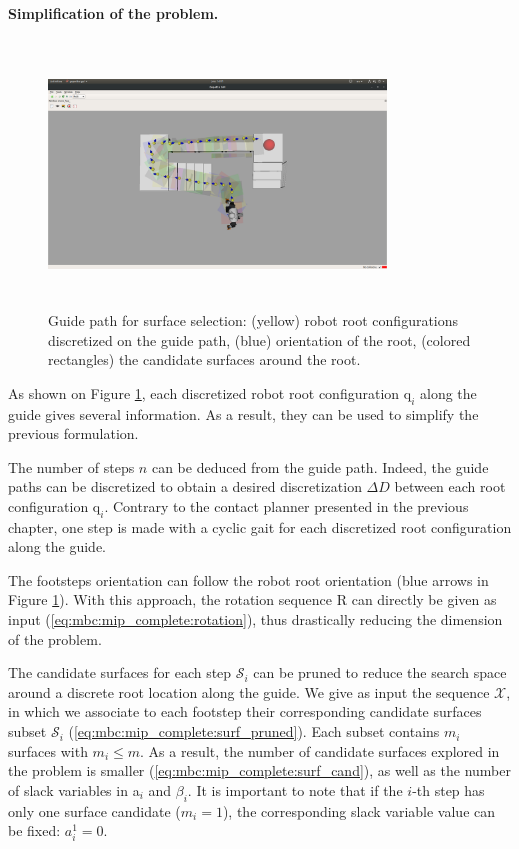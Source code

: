 \paragraph{Simplification of the problem.}
\begin{figure}[h!]
    \centering
    \captionsetup[subfigure]{justification=centering}
    \includegraphics[trim={15cm 5cm 18cm 7cm},clip,width=0.8\textwidth,height=7cm]{Figures/Chapter_MIP_SL1M/bauzil_guide_surfaces.png}
    \caption{Guide path for surface selection: (yellow) robot root configurations discretized on the guide path, (blue) orientation of the root, (colored rectangles) the candidate surfaces around the root.\label{fig:mip:bauzil_guide_surfaces}}
\end{figure}
As shown on Figure \ref{fig:mip:bauzil_guide_surfaces}, each discretized robot root configuration $\mbox{q}_i$ along the guide gives several information. As a result, they can be used to simplify the previous formulation.

The number of steps $n$ can be deduced from the guide path.
Indeed, the guide paths can be discretized to obtain a desired discretization $\Delta D$ between each root configuration $\mbox{q}_i$.
Contrary to the contact planner presented in the previous chapter, one step is made with a cyclic gait for each discretized root configuration along the guide.

The footsteps orientation can follow the robot root orientation (blue arrows in Figure \ref{fig:mip:bauzil_guide_surfaces}).
With this approach, the rotation sequence R can directly be given as input (\ref{eq:mbc:mip_complete:rotation}), thus drastically reducing the dimension of the problem.

The candidate surfaces for each step $\mathcal{S}_i$ can be pruned to reduce the search space around a discrete root location along the guide.
We give as input the sequence $\mathcal{X}$, in which we associate to each footstep their corresponding candidate surfaces subset $\mathcal{S}_i$ (\ref{eq:mbc:mip_complete:surf_pruned}). Each subset contains $m_i$ surfaces with $m_i \leq m$. 
As a result, the number of candidate surfaces explored in the problem is smaller (\ref{eq:mbc:mip_complete:surf_cand}), as well as the number of slack variables in a$_i$ and $\beta_i$.
It is important to note that if the $i$-th step has only one surface candidate ($m_i=1$), the corresponding slack variable value can be fixed: $a_i^1 = 0$.

